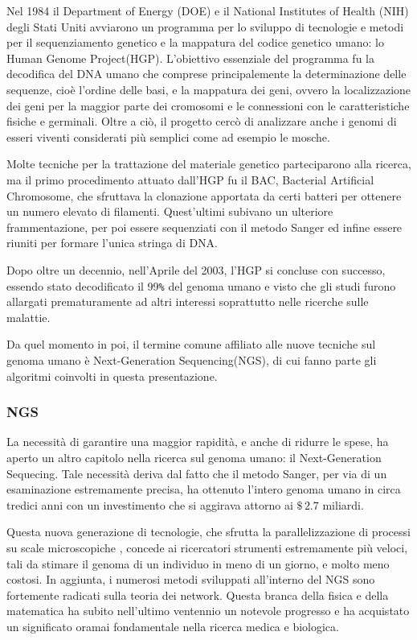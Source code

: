 Nel 1984 il Department of Energy (DOE) e il National Institutes of Health (NIH) degli Stati Uniti avviarono un programma per lo sviluppo di tecnologie e metodi per il sequenziamento genetico e la mappatura del codice genetico umano: lo Human Genome Project(HGP).
L'obiettivo essenziale del programma fu la decodifica del DNA umano che comprese principalemente la determinazione delle sequenze, cioè l'ordine delle basi, e la mappatura dei geni, ovvero la localizzazione dei geni per la maggior parte dei cromosomi e le connessioni con le caratteristiche fisiche e germinali.
Oltre a ciò, il progetto cercò di analizzare anche i genomi di esseri viventi considerati più semplici come ad esempio le mosche.

Molte tecniche per la trattazione del materiale genetico parteciparono alla ricerca, ma il primo procedimento attuato dall'HGP fu il BAC, Bacterial Artificial Chromosome, che sfruttava la clonazione apportata da certi batteri per ottenere un numero elevato di filamenti.
Quest'ultimi subivano un ulteriore frammentazione, per poi essere sequenziati con il metodo Sanger ed infine essere riuniti per formare l'unica stringa di DNA.

Dopo oltre un decennio, nell'Aprile del 2003, l'HGP si concluse con successo, essendo stato decodificato il 99\verb!%! del genoma umano e visto che gli studi furono allargati prematuramente ad altri interessi soprattutto nelle ricerche sulle malattie.

Da quel momento in poi, il termine comune affiliato alle nuove tecniche sul genoma umano è Next-Generation Sequencing(NGS), di cui fanno parte gli algoritmi coinvolti in questa presentazione.

\subsubsection{NGS}
La necessità di garantire una maggior rapidità, e anche di ridurre le spese, ha aperto un altro capitolo nella ricerca sul genoma umano: il Next-Generation Sequecing\cite{Behjati2013}.
Tale necessità deriva dal fatto che il metodo Sanger, per via di un esaminazione estremamente precisa, ha ottenuto l'intero genoma umano in circa tredici anni con un investimento che si aggirava attorno ai $\$\,2.7$ miliardi.
 
Questa nuova generazione di tecnologie, che sfrutta la parallelizzazione di processi su scale microscopiche \cite{Shendure2008}, concede ai ricercatori strumenti estremamente più veloci, tali da stimare il genoma di un individuo in meno di un giorno, e molto meno costosi.
In aggiunta, i numerosi metodi sviluppati all'interno del NGS sono fortemente radicati sulla teoria dei network. 
Questa branca della fisica e della matematica ha subito nell'ultimo ventennio un notevole progresso e ha acquistato un significato oramai fondamentale nella ricerca medica e biologica. 

